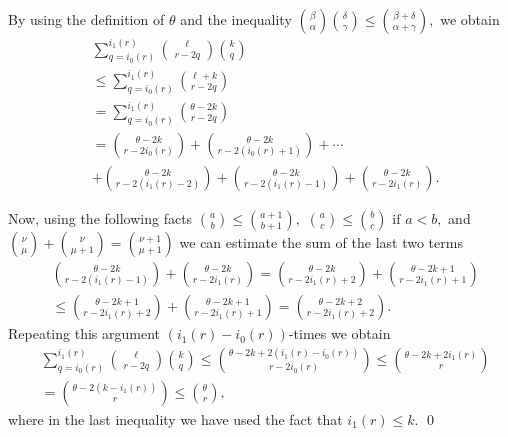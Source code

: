 \documentclass{beamer}
\numberwithin{equation}{section}
\begin{document}
\begin{frame}
%
By using the definition of $\theta$ and the inequality $
\binom{\beta}{\alpha}\binom{\delta}{\gamma}\leq
\binom{\beta+\delta}{\alpha+\gamma},
$
%
we obtain
\begin{equation*}
\begin{split}
 &\sum_{
q=i_0(r)}^{i_1(r)}\binom{\ell}{r-2q}\binom{k}{q}
\\
& \le \sum_{
q=i_0(r)}^{i_1(r)}\binom{\ell +k}{r-2q}
\\
& =\sum_{
q=i_0(r)}^{i_1(r)}\binom{\theta-2k}{r-2q}\\
&=\binom{\theta-2k}{r-2i_0(r)}+\binom{\theta-2k}{r-2(i_0(r)+1)}+\cdots
\\
&+\binom{\theta-2k}{r-2(i_1(r)-2)}+\binom{\theta-2k}{r-2(i_1(r)-1)}
+\binom{\theta-2k}{r-2i_1(r)}.
\end{split}
\end{equation*}
%
\end{frame}
%
%
\begin{frame}
Now, using the following facts
%
$ \binom{a}{b}\le \binom{a+1}{b+1},
$
%
%
$
 \binom{a}{c}\le \binom{b}{c}\,\,\text{if}\,\,a<b,
$
%
 and
%
 $
 \binom{\nu}{\mu}+\binom{\nu}{\mu
+1}=\binom{\nu +1}{\mu +1}
$
we can estimate the sum of the last two terms
\begin{equation*}
\begin{split}
&\binom{\theta-2k}{r-2(i_1(r)-1)} +\binom{\theta-2k}{r-2i_1(r)}=
\binom{\theta-2k}{r-2i_1(r)+2}+\binom{\theta-2k+1}{r-2i_1(r)+1}\\
&\le \binom{\theta-2k+1}{r-2i_1(r)+2}+\binom{\theta-2k+1}{r-2i_1(r)+1}
=\binom{\theta-2k+2}{r-2i_1(r)+2}.
\end{split}
\end{equation*}
%
Repeating this argument $(i_1(r)-i_0(r))$-times we obtain
\begin{equation*}
\begin{split}
&\sum_{ q=i_0(r)}^{i_1(r)}\binom{\ell}{r-2q}\binom{k}{q}\le
\binom{\theta-2k+2(i_1(r)-i_0(r))}{r-2i_0(r)}\le
\binom{\theta-2k+2i_1(r)}{r}\\
&=\binom{\theta-2(k-i_1(r))}{r}\le \binom{\theta}{r},
\end{split}
\end{equation*}
where in the last inequality we have used the fact that $i_1(r)\le
k$. \qed
\end{frame}
%
%
%
%
%
%
%
%
%
%
\end{document}
